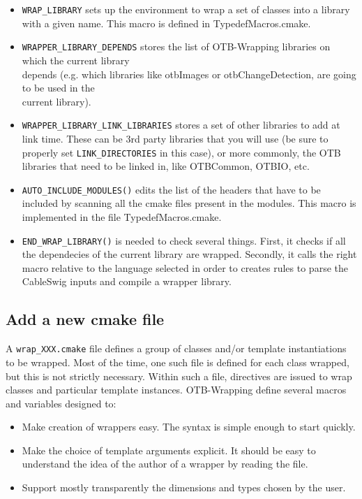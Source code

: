 \begin{itemize}
\item \verb$WRAP_LIBRARY$  sets up the environment to wrap a set of classes into a 
      library with a given name. This macro is defined in TypedefMacros.cmake. 
\item \verb$WRAPPER_LIBRARY_DEPENDS$ stores the list of OTB-Wrapping libraries on which the current library\\
      depends (e.g. which libraries like otbImages or otbChangeDetection, are going to be used in the \\
      current library). 
\item \verb$WRAPPER_LIBRARY_LINK_LIBRARIES$ stores a set of other libraries to add at link time. 
These can be 3rd party libraries that you will use 
(be sure to properly set \verb$LINK_DIRECTORIES$ in this case), 
or more commonly, the OTB libraries that need to 
be linked in, like OTBCommon, OTBIO, etc.
\item \verb$AUTO_INCLUDE_MODULES()$  edits the list of the headers that have to 
      be included by scanning all the cmake files present in the modules. This macro is implemented in the 
      file TypedefMacros.cmake.

\item \verb$END_WRAP_LIBRARY()$ is needed to check several things. First, it checks if all the dependecies 
      of the current library are wrapped. Secondly, it calls the right macro relative to the language selected
      in order to creates rules to parse the CableSwig inputs and compile a wrapper library. 
\end{itemize}

\subsection{Add a new cmake file}
A \verb$wrap_XXX.cmake$ file defines a group of classes and/or template instantiations to be wrapped. 
Most of the time, one such file is defined for each class wrapped, but this is not strictly necessary. 
Within such a file, directives are issued to wrap classes and particular template instances.
OTB-Wrapping define several macros and variables designed to:

\begin{itemize}
\item Make creation of wrappers easy. The syntax is simple enough to start quickly.
\item Make the choice of template arguments explicit. It should be easy 
      to understand the idea of the author of a wrapper by reading the file. 
\item Support mostly transparently the dimensions and types chosen by the user.
\end{itemize}

